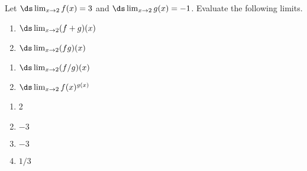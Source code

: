 {Let $\ds \lim_{x\to2} f(x) = 3$ and $\ds \lim_{x\to2} g(x) = -1$. Evaluate the following limits.

\begin{minipage}[t]{.5\linewidth}
\begin{enumerate}
\item		$\ds \lim_{x\to2}(f+g)(x)$
\item		$\ds \lim_{x\to2}(fg)(x)$
\end{enumerate}
\end{minipage}
\begin{minipage}[t]{.5\linewidth}
\begin{enumerate}\addtocounter{enumii}{2}
\item		$\ds \lim_{x\to2}(f/g)(x)$
\item		$\ds \lim_{x\to2}f(x)^{g(x)}$
\end{enumerate}
\end{minipage}
}
{\begin{enumerate}
\item		2
\item		$-3$
\item		$-3$
\item		$1/3$
\end{enumerate}
}
